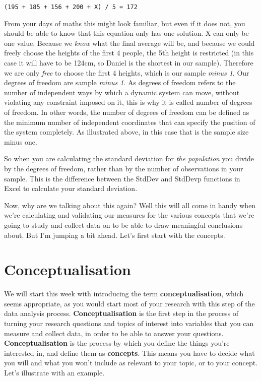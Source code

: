 \documentclass[]{book}
\theoremstyle{definition}
\theoremstyle{definition}
\theoremstyle{definition}
\theoremstyle{remark}
\begin{document}
\texttt{(195\ +\ 185\ +\ 156\ +\ 200\ +\ X)\ /\ 5\ =\ 172}

From your days of maths this might look familiar, but even if it does
not, you should be able to know that this equation only has one
solution. X can only be one value. Because we \emph{know} what the final
average will be, and because we could freely choose the heights of the
first 4 people, the 5th height is restricted (in this case it will have
to be 124cm, so Daniel is the shortest in our sample). Therefore we are
only \emph{free} to choose the first 4 heights, which is our sample
\emph{minus 1}. Our degrees of freedom are sample \emph{minus 1}. As
degrees of freedom refers to the number of independent ways by which a
dynamic system can move, without violating any constraint imposed on it,
this is why it is called number of degrees of freedom. In other words,
the number of degrees of freedom can be defined as the minimum number of
independent coordinates that can specify the position of the system
completely. As illustrated above, in this case that is the sample size
minus one.

So when you are calculating the standard deviation for \emph{the
population} you divide by the degrees of freedom, rather than by the
number of observations in your sample. This is the difference between
the StdDev and StdDevp functions in Excel to calculate your standard
deviation.

Now, why are we talking about this again? Well this will all come in
handy when we're calculating and validating our measures for the various
concepts that we're going to study and collect data on to be able to
draw meaningful conclusions about. But I'm jumping a bit ahead. Let's
first start with the concepts.

\hypertarget{conceptualisation}{%
\section{Conceptualisation}\label{conceptualisation}}

We will start this week with introducing the term
\textbf{conceptualisation}, which seems appropriate, as you would start
most of your research with this step of the data analysis process.
\textbf{Conceptualisation} is the first step in the process of turning
your research questions and topics of interest into variables that you
can measure and collect data, in order to be able to answer your
questions. \textbf{Conceptualisation} is the process by which you define
the things you're interested in, and define them as \textbf{concepts}.
This means you have to decide what you will and what you won't include
as relevant to your topic, or to your concept. Let's illustrate with an
example.
\end{document}
